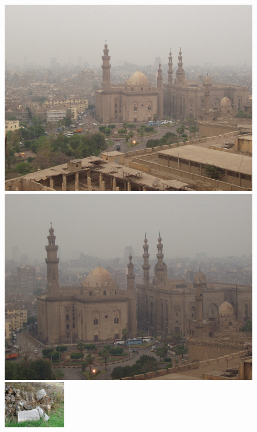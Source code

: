 \documentclass[12pt]{article}
\begin{document}
\begin{itemize}
\begin{figure}[H]
	\centering
	\begin{minipage}{.4\textwidth}
		\includegraphics[width=\textwidth]{gvrFChgrkm.jpg}
	\end{minipage}
	\begin{minipage}{.4\textwidth}
		\includegraphics[width=\textwidth]{DqBHrGnVao.jpg}
	\end{minipage}
	\includegraphics[width=0.24\textwidth]{KnZcwwndxw.jpg}

\end{figure}
\end{itemize}
\end{document}
